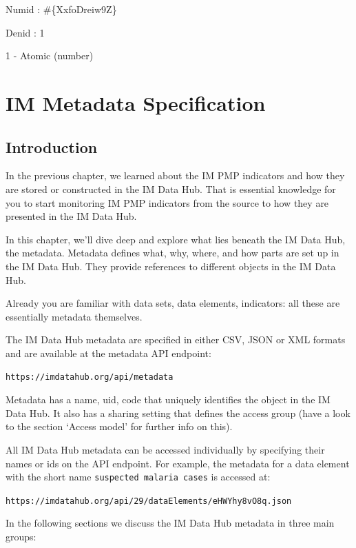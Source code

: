 \documentclass[]{book}
\begin{document}
Numid : \#\{XxfoDreiw9Z\}

Denid : 1

1 - Atomic (number)

\hypertarget{meta}{%
\chapter{IM Metadata Specification}\label{meta}}

\hypertarget{introduction-2}{%
\section{Introduction}\label{introduction-2}}

In the previous chapter, we learned about the IM PMP indicators and how they are stored or constructed in the IM Data Hub. That is essential knowledge for you to start monitoring IM PMP indicators from the source to how they are presented in the IM Data Hub.

In this chapter, we'll dive deep and explore what lies beneath the IM Data Hub, the metadata. Metadata defines what, why, where, and how parts are set up in the IM Data Hub. They provide references to different objects in the IM Data Hub.

Already you are familiar with data sets, data elements, indicators: all these are essentially metadata themselves.

The IM Data Hub metadata are specified in either CSV, JSON or XML formats and are available at the metadata API endpoint:

\texttt{https://imdatahub.org/api/metadata}

Metadata has a name, uid, code that uniquely identifies the object in the IM Data Hub. It also has a sharing setting that defines the access group (have a look to the section `Access model' for further info on this).

All IM Data Hub metadata can be accessed individually by specifying their names or ids on the API endpoint. For example, the metadata for a data element with the short name \texttt{suspected\ malaria\ cases} is accessed at:

\texttt{https://imdatahub.org/api/29/dataElements/eHWYhy8vO8q.json}

In the following sections we discuss the IM Data Hub metadata in three main groups:
\end{document}
